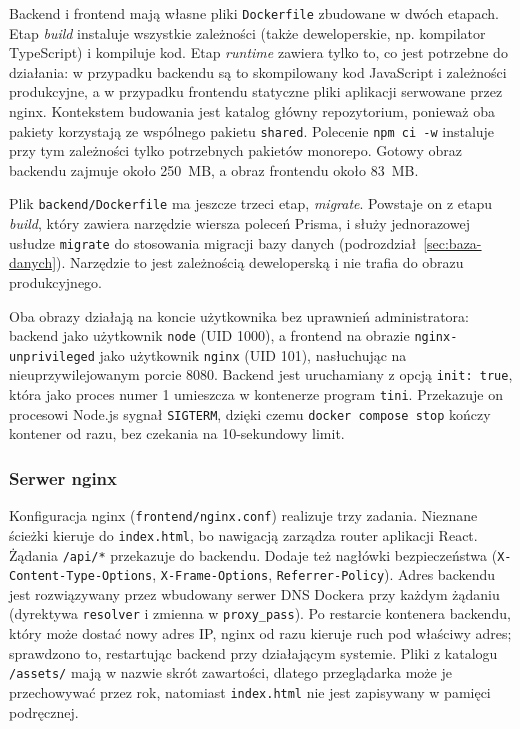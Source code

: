 Backend i frontend mają własne pliki \texttt{Dockerfile} zbudowane w dwóch
etapach. Etap \emph{build} instaluje wszystkie zależności (także
deweloperskie, np. kompilator TypeScript) i kompiluje kod. Etap \emph{runtime}
zawiera tylko to, co jest potrzebne do działania: w przypadku backendu są to
skompilowany kod JavaScript i zależności produkcyjne, a w przypadku frontendu
statyczne pliki aplikacji serwowane przez nginx. Kontekstem budowania jest
katalog główny repozytorium, ponieważ oba pakiety korzystają ze wspólnego
pakietu \texttt{shared}. Polecenie \texttt{npm ci -w} instaluje przy tym
zależności tylko potrzebnych pakietów monorepo. Gotowy obraz backendu zajmuje
około 250~MB, a obraz frontendu około 83~MB.

Plik \texttt{backend/Dockerfile} ma jeszcze trzeci etap, \emph{migrate}. Powstaje
on z etapu \emph{build}, który zawiera narzędzie wiersza poleceń Prisma, i służy
jednorazowej usłudze \texttt{migrate} do stosowania migracji bazy danych
(podrozdział~\ref{sec:baza-danych}). Narzędzie to jest zależnością deweloperską
i nie trafia do obrazu produkcyjnego.

Oba obrazy działają na koncie użytkownika bez uprawnień administratora:
backend jako użytkownik \texttt{node} (UID 1000), a frontend na obrazie
\texttt{nginx-unprivileged} jako użytkownik \texttt{nginx} (UID 101),
nasłuchując na nieuprzywilejowanym porcie 8080. Backend jest uruchamiany
z opcją \texttt{init: true}, która jako proces numer 1 umieszcza w kontenerze
program \texttt{tini}. Przekazuje on procesowi Node.js sygnał \texttt{SIGTERM},
dzięki czemu \texttt{docker compose stop} kończy kontener od razu, bez
czekania na 10-sekundowy limit.

\subsubsection{Serwer nginx}

Konfiguracja nginx (\texttt{frontend/nginx.conf}) realizuje trzy
zadania. Nieznane ścieżki kieruje do \texttt{index.html}, bo nawigacją
zarządza router aplikacji React. Żądania \texttt{/api/*} przekazuje do
backendu. Dodaje też nagłówki bezpieczeństwa (\texttt{X-Content-Type-Options},
\texttt{X-Frame-Options}, \texttt{Referrer-Policy}). Adres backendu jest
rozwiązywany przez wbudowany serwer DNS Dockera przy każdym żądaniu (dyrektywa
\texttt{resolver} i zmienna w \texttt{proxy\_pass}). Po restarcie kontenera
backendu, który może dostać nowy adres IP, nginx od razu kieruje ruch pod
właściwy adres; sprawdzono to, restartując backend przy działającym systemie.
Pliki z katalogu \texttt{/assets/} mają w nazwie skrót zawartości, dlatego
przeglądarka może je przechowywać przez rok, natomiast \texttt{index.html}
nie jest zapisywany w pamięci podręcznej.

